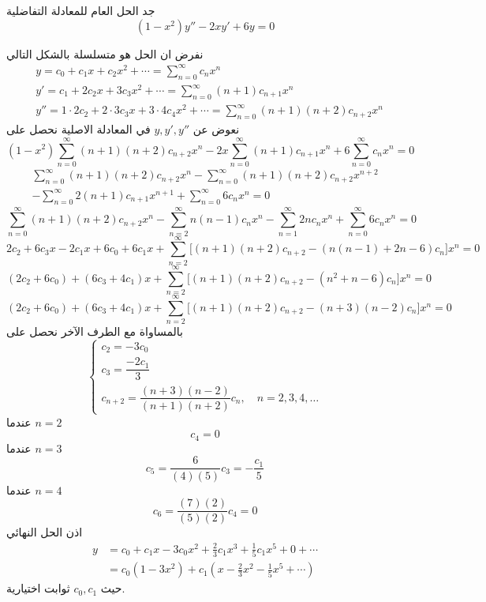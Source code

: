 \begin{example}
	جد الحل العام للمعادلة التفاضلية
	\[
	(1-x^2) y'' - 2xy' + 6y =0
	\]
\end{example}
\begin{solution}
	نفرض ان الحل هو متسلسلة بالشكل التالي
	\begin{align*}
		& y = c_0 + c_1 x + c_2 x^2 + \cdots = \sum_{n=0}^{\infty} c_n x^n \\[10pt]
		& y' = c_1 + 2c_2x + 3c_3 x^2 + \cdots = \sum_{n=0}^{\infty} (n+1)c_{n+1} x^n \\[10pt]
		& y'' = 1\cdot2 c_2 + 2\cdot3 c_3x + 3\cdot4 c_4 x^2 + \cdots = \sum_{n=0}^{\infty} (n+1)(n+2)c_{n+2}x^n 
	\end{align*}
	نعوض عن $y,y',y''$ في المعادلة الاصلية نحصل على 
	\[
	(1-x^2) \sum_{n=0}^{\infty} (n+1)(n+2)c_{n+2}x^n - 2x \sum_{n=0}^{\infty} (n+1)c_{n+1} x^n + 6\sum_{n=0}^{\infty} c_n x^n =0
	\]
	\begin{multline*}
		\sum_{n=0}^{\infty} (n+1)(n+2)c_{n+2}x^n - \sum_{n=0}^{\infty} (n+1)(n+2)c_{n+2}x^{n+2}   \\ -\sum_{n=0}^{\infty} 2(n+1)c_{n+1} x^{n+1} + \sum_{n=0}^{\infty} 6c_n x^n =0
	\end{multline*}
	\[
		\sum_{n=0}^{\infty} (n+1)(n+2)c_{n+2}x^n - \sum_{n=2}^{\infty} n(n-1)c_{n}x^{n}    -\sum_{n=1}^{\infty} 2nc_{n} x^{n} + \sum_{n=0}^{\infty} 6c_n x^n =0
\]
\[
2c_2 + 6c_3 x - 2c_1x + 6c_0 + 6c_1 x + \sum_{n=2}^{\infty} \big[(n+1)(n+2)c_{n+2} - (n(n-1) +2n -6)c_n\big] x^n = 0
\]
\[
(2c_2 +6c_0) + (6c_3 +4c_1)x  + \sum_{n=2}^{\infty} \big[(n+1)(n+2)c_{n+2} - (n^2+n -6)c_n\big] x^n = 0
\]
\[
(2c_2 +6c_0) + (6c_3 +4c_1)x  + \sum_{n=2}^{\infty} \big[(n+1)(n+2)c_{n+2} - (n+3)(n-2)c_n\big] x^n = 0
\]
بالمساواة مع الطرف الآخر نحصل على
\[
\left\{
\begin{array}{l}
	c_2 = -3c_0\\
	c_3 = \dfrac{-2c_1}{3}\\
	c_{n+2} = \dfrac{(n+3)(n-2)}{(n+1)(n+2)} c_n , \quad n=2,3,4,\dots
\end{array}
\right.
\]
عندما $n=2 $ 
\[
c_4 = 0
\]
عندما $n=3 $
\[
c_5 = \frac{6}{(4)(5)} c_3 =- \frac{c_1}{5}
\]
عندما $n=4 $ 
\[
c_6 = \frac{(7)(2)}{(5)(2)} c_4 = 0
\]
اذن الحل النهائي 
\begin{align*}
	y &= c_0 + c_1 x - 3c_0 x^2 + \frac{2}{3}c_1 x^3 +  \frac{1}{5}c_1 x^5 + 0 + \cdots\\
	& = c_0 (1-3x^2) + c_1 \left(x - \frac{2}{3}x^2 - \frac{1}{5}x^5 + \cdots\right)
\end{align*}
حيث $c_0, c_1 $ ثوابت اختيارية.
\end{solution}

